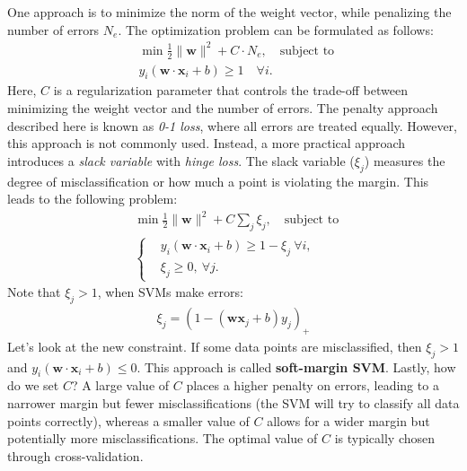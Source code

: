 One approach is to minimize the norm of the weight vector, while penalizing the number of errors $N_e$. The optimization problem can be formulated as follows:
\begin{align*}
	&\min \frac{1}{2}\lVert \mathbf{w}\rVert^2 +C\cdot N_{e},\quad \text{subject to } \\
	&y_i(\mathbf{w}\cdot \mathbf{x}_i+b)\geq 1 \quad \forall i.
\end{align*}
Here, $C$ is a regularization parameter that controls the trade-off between minimizing the weight vector and the number of errors. The penalty approach described here is known as \textit{0-1 loss}, where all errors are treated equally. However, this approach is not commonly used. Instead, a more practical approach introduces a \textit{slack variable} with \textit{hinge loss}. The slack variable ($\xi_j$) measures the degree of misclassification or how much a point is violating the margin. This leads to the following problem:
\begin{align*}
	&\min \frac{1}{2}\lVert \mathbf{w}\rVert^2 +C\sum_j\xi_j ,\quad \textrm{subject to }\\
		 &\begin{cases}
		&y_i(\mathbf{w}\cdot \mathbf{x}_i+b)\geq 1-\xi_j \ \forall i,\quad \\
		&\xi_j\geq 0,\ \forall j.
	\end{cases}
\end{align*}
Note that $\xi_j>1$, when SVMs make errors:
\begin{align*}
	\xi_j = (1-(\mathbf{w}\mathbf{x}_j+b)y_j)_+
\end{align*}
Let's look at the new constraint. If some data points are misclassified, then $\xi_j>1$ and $y_i(\mathbf{w}\cdot \mathbf{x}_i+b)\leq 0$. This approach is called \textbf{soft-margin SVM}. Lastly, how do we set $C$? A large value of $C$ places a higher penalty on errors, leading to a narrower margin but fewer misclassifications (\ie  the SVM will try to classify all data points correctly), whereas a smaller value of $C$ allows for a wider margin but potentially more misclassifications. The optimal value of $C$ is typically chosen through cross-validation.














